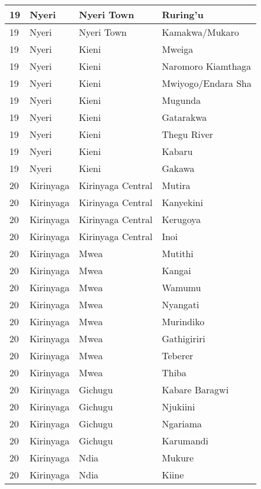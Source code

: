 \begin{table}[!ht]
\begin{tabular}{|l|l|l|l|}
        19 & Nyeri & Nyeri Town & Ruring’u \\ \hline
        19 & Nyeri & Nyeri Town & Kamakwa/Mukaro \\ \hline
        19 & Nyeri & Kieni & Mweiga \\ \hline
        19 & Nyeri & Kieni & Naromoro Kiamthaga \\ \hline
        19 & Nyeri & Kieni & Mwiyogo/Endara Sha \\ \hline
        19 & Nyeri & Kieni & Mugunda \\ \hline
        19 & Nyeri & Kieni & Gatarakwa \\ \hline
        19 & Nyeri & Kieni & Thegu River \\ \hline
        19 & Nyeri & Kieni & Kabaru \\ \hline
        19 & Nyeri & Kieni & Gakawa \\ \hline
        20 & Kirinyaga & Kirinyaga Central & Mutira \\ \hline
        20 & Kirinyaga & Kirinyaga Central & Kanyekini \\ \hline
        20 & Kirinyaga & Kirinyaga Central & Kerugoya \\ \hline
        20 & Kirinyaga & Kirinyaga Central & Inoi \\ \hline
        20 & Kirinyaga & Mwea & Mutithi \\ \hline
        20 & Kirinyaga & Mwea & Kangai \\ \hline
        20 & Kirinyaga & Mwea & Wamumu \\ \hline
        20 & Kirinyaga & Mwea & Nyangati \\ \hline
        20 & Kirinyaga & Mwea & Murindiko \\ \hline
        20 & Kirinyaga & Mwea & Gathigiriri \\ \hline
        20 & Kirinyaga & Mwea & Teberer \\ \hline
        20 & Kirinyaga & Mwea & Thiba \\ \hline
        20 & Kirinyaga & Gichugu & Kabare Baragwi \\ \hline
        20 & Kirinyaga & Gichugu & Njukiini \\ \hline
        20 & Kirinyaga & Gichugu & Ngariama \\ \hline
        20 & Kirinyaga & Gichugu & Karumandi \\ \hline
        20 & Kirinyaga & Ndia & Mukure \\ \hline
        20 & Kirinyaga & Ndia & Kiine \\ \hline

\end{tabular}
\end{table}
